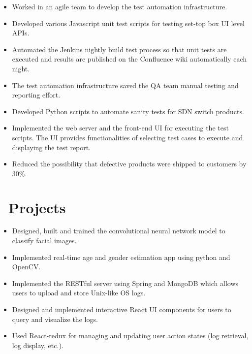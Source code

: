\documentclass{resume}
\begin{document}
\begin{itemize}
	\item Worked in an agile team to develop the test automation infrastructure.
	\item Developed various Javascript unit test scripts for testing set-top box UI level APIs.
	\item Automated the Jenkins nightly build test process so that unit tests are executed and results are published on the Confluence wiki automatically each night.
	\item The test automation infrastructure saved the QA team manual testing and reporting effort.
\end{itemize}

\begin{itemize}
	\item Developed Python scripts to automate sanity tests for SDN switch products.
	\item Implemented the web server and the front-end UI for executing the test scripts. The UI provides functionalities of selecting test cases to execute and displaying the test report.
	\item Reduced the possibility that defective products were shipped to customers by 30\%.
\end{itemize}

\section{\faUsers\ Projects}
\begin{itemize}
	\item Designed, built and trained the convolutional neural network model to classify facial images.
	\item Implemented real-time age and gender estimation app using python and OpenCV. 
\end{itemize}

\begin{itemize}
	\item Implemented the RESTful server using Spring and MongoDB which allows users to upload and store Unix-like OS logs.
	\item Designed and implemented interactive React UI components for users to query and visualize the logs. 
	\item Used React-redux for managing and updating user action states (log retrieval, log display, etc.).
\end{itemize}
\end{document}
